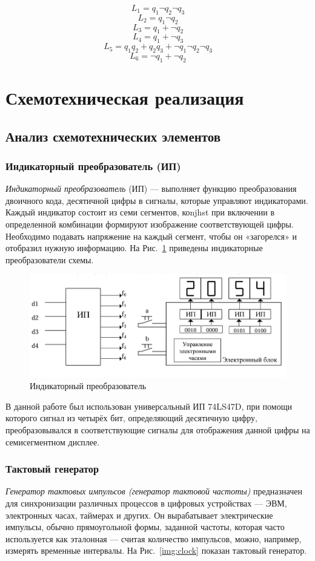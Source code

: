 \documentclass[a4paper, final]{article}
\begin{document}
\[L_1 = q_1 \neg q_2 \neg q_3\]
\[L_2 = q_1 \neg q_2\]
\[L_3 = q_1 + \neg q_2\]
\[L_4 = q_1 + \neg q_3\]
\[L_5 = q_1 q_2 + q_2 q_3 + \neg q_1 \neg q_2 \neg q_3\]
\[L_6 = \neg q_1 + \neg q_2\]

\newpage
\section{Схемотехническая реализация}
\subsection{Анализ схемотехнических элементов}
\subsubsection{Индикаторный преобразователь (ИП)}
\textit{Индикаторный преобразователь} (ИП) --- выполняет функцию преобразования двоичного кода, десятичной цифры в сигналы, которые управляют индикаторами. Каждый индикатор состоит из семи сегментов, коnjhst при включении в определенной комбинации формируют изображение соответствующей цифры. Необходимо подавать напряжение на каждый сегмент, чтобы он «загорелся» и отобразил нужную информацию. На Рис.~\ref{img:IC} приведены индикаторные преобразователи схемы.

\begin{figure}[H]
   \centering
   \includegraphics[width=1\linewidth]{IC.png}
   \caption{Индикаторный преобразователь}
   \label{img:IC}
\end{figure}

В данной работе был использован универсальный ИП 74LS47D, при помощи которого сигнал из четырёх бит, определяющий десятичную цифру, преобразовывался в соответствующие сигналы для отображения данной цифры на семисегментном дисплее.

\subsubsection{Тактовый генератор}
\textit{Генератор тактовых импульсов (генератор тактовой частоты)} предназначен для синхронизации различных процессов в цифровых устройствах --- ЭВМ, электронных часах, таймерах и других. Он вырабатывает электрические импульсы, обычно прямоугольной формы,
заданной частоты, которая часто используется как эталонная --- считая количество импульсов, можно, например, измерять временные интервалы. На Рис.~\ref{img:clock} показан тактовый генератор.
\end{document}
